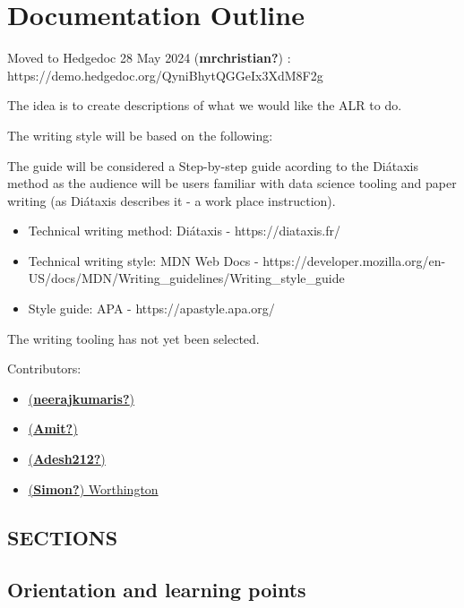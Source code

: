 \documentclass[
  letterpaper,
  DIV=11,
  numbers=noendperiod]{scrreprt}
\author{}
\date{}
\providecommand{\tightlist}{%
  \setlength{\itemsep}{0pt}\setlength{\parskip}{0pt}}\usepackage{longtable,booktabs,array}
\begin{document}
\chapter{Documentation Outline}\label{documentation-outline}

Moved to Hedgedoc 28 May 2024 (\textbf{mrchristian?}) :
https://demo.hedgedoc.org/QyniBhytQGGeIx3XdM8F2g

The idea is to create descriptions of what we would like the ALR to do.

The writing style will be based on the following:

The guide will be considered a Step-by-step guide acording to the
Diátaxis method as the audience will be users familiar with data science
tooling and paper writing (as Diátaxis describes it - a work place
instruction).

\begin{itemize}
\tightlist
\item
  Technical writing method: Diátaxis - https://diataxis.fr/
\item
  Technical writing style: MDN Web Docs -
  https://developer.mozilla.org/en-US/docs/MDN/Writing\_guidelines/Writing\_style\_guide
\item
  Style guide: APA - https://apastyle.apa.org/
\end{itemize}

The writing tooling has not yet been selected.

Contributors:

\begin{itemize}
\tightlist
\item
  \href{https://github.com/neerajkumaris}{(\textbf{neerajkumaris?})}
\item
  \href{https://github.com/ydv-amit-ydv}{(\textbf{Amit?})}
\item
  \href{https://github.com/Adesh212}{(\textbf{Adesh212?})}
\item
  \href{https://github.com/mrchristian}{(\textbf{Simon?}) Worthington}
\end{itemize}

\section{SECTIONS}\label{sections}

\section{Orientation and learning
points}\label{orientation-and-learning-points}
\end{document}

